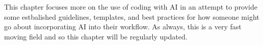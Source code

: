 \documentclass[
]{book}
\begin{document}
This chapter focuses more on the use of coding with AI in an attempt to provide some estbalished guidelines, templates, and best practices for how someone might go about incorporating AI into their workflow. As always, this is a very fast moving field and so this chapter will be regularly updated.

  
\end{document}
